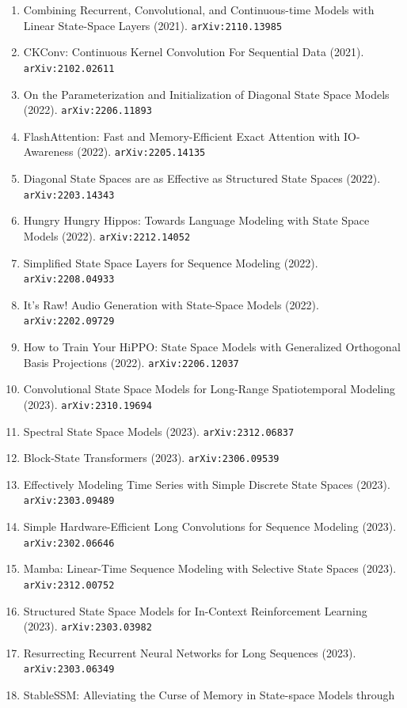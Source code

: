 \documentclass[11pt]{article}
\begin{document}
\begin{enumerate}
  \item Combining Recurrent, Convolutional, and Continuous-time Models with
  Linear State-Space Layers (2021). \texttt{arXiv:2110.13985}
  \item CKConv: Continuous Kernel Convolution For Sequential Data (2021). \texttt{arXiv:2102.02611}
  \item On the Parameterization and Initialization of Diagonal State Space
  Models (2022). \texttt{arXiv:2206.11893}
  \item FlashAttention: Fast and Memory-Efficient Exact Attention with
  IO-Awareness (2022). \texttt{arXiv:2205.14135}
  \item Diagonal State Spaces are as Effective as Structured State Spaces (2022). \texttt{arXiv:2203.14343}
  \item Hungry Hungry Hippos: Towards Language Modeling with State Space Models (2022). \texttt{arXiv:2212.14052}
  \item Simplified State Space Layers for Sequence Modeling (2022). \texttt{arXiv:2208.04933}
  \item It's Raw! Audio Generation with State-Space Models (2022). \texttt{arXiv:2202.09729}
  \item How to Train Your HiPPO: State Space Models with Generalized Orthogonal
  Basis Projections (2022). \texttt{arXiv:2206.12037}
  \item Convolutional State Space Models for Long-Range Spatiotemporal Modeling (2023). \texttt{arXiv:2310.19694}
  \item Spectral State Space Models (2023). \texttt{arXiv:2312.06837}
  \item Block-State Transformers (2023). \texttt{arXiv:2306.09539}
  \item Effectively Modeling Time Series with Simple Discrete State Spaces (2023). \texttt{arXiv:2303.09489}
  \item Simple Hardware-Efficient Long Convolutions for Sequence Modeling (2023). \texttt{arXiv:2302.06646}
  \item Mamba: Linear-Time Sequence Modeling with Selective State Spaces (2023). \texttt{arXiv:2312.00752}
  \item Structured State Space Models for In-Context Reinforcement Learning (2023). \texttt{arXiv:2303.03982}
  \item Resurrecting Recurrent Neural Networks for Long Sequences (2023). \texttt{arXiv:2303.06349}
  \item StableSSM: Alleviating the Curse of Memory in State-space Models through

\end{enumerate}
\end{document}
